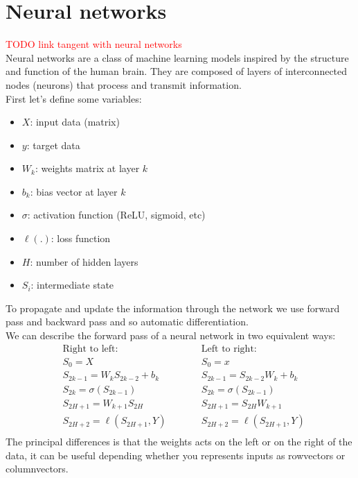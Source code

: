 \documentclass[12pt, openany]{report}
\theoremstyle{definition}
\begin{document}
\chapter{Neural networks}
\textcolor{red}{TODO link tangent with neural networks}\\
Neural networks are a class of machine learning models inspired by the structure and function of the human brain. They are composed of layers of interconnected nodes (neurons) that process and transmit information.\\
First let's define some variables:
\begin{itemize}
  \item $X$: input data (matrix)
  \item $y$: target data
  \item $W_k$: weights matrix at layer $k$
  \item $b_k$: bias vector at layer $k$
  \item $\sigma$: activation function (ReLU, sigmoid, etc)
  \item $\ell(.)$: loss function 
  \item $H$: number of hidden layers
  \item $S_i$: intermediate state  
\end{itemize} 
To propagate and update the information through the network we use forward pass and backward pass and so automatic differentiation.\\
We can describe the forward pass of a neural network in two equivalent ways:
\begin{equation}
  \begin{aligned}
    &\text{Right to left:} \qquad &&\text{Left to right:}\\
    &S_0 = X \qquad &&S_0 = x\\
    &S_{2k-1} = W_k S_{2k-2} + b_k \qquad &&S_{2k-1} = S_{2k-2}W_k + b_k\\
    &S_{2k} = \sigma(S_{2k-1}) \qquad &&S_{2k} = \sigma(S_{2k-1})\\
    &S_{2H+1} = W_{k+1}S_{2H} \qquad &&S_{2H+1} = S_{2H}W_{k+1}\\
    &S_{2H+2} = \ell(S_{2H+1}, Y) \qquad &&S_{2H+2} = \ell(S_{2H+1}, Y)\\ 
  \end{aligned}
\end{equation}
The principal differences is that the weights acts on the left or on the right of the data, it can be useful depending whether you represents inputs as rowvectors or columnvectors.\\
\end{document}
